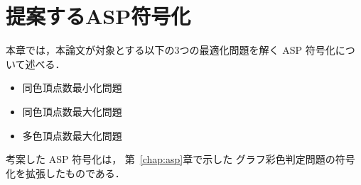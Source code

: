 \chapter{提案するASP符号化}\label{chap:encoding}

本章では，本論文が対象とする以下の3つの最適化問題を解く ASP 符号化につ
いて述べる．

\begin{itemize}
\item 同色頂点数最小化問題
\item 同色頂点数最大化問題
\item 多色頂点数最大化問題
\end{itemize}

考案した ASP 符号化は，
第~\ref{chap:asp}章で示した
グラフ彩色判定問題の符号化を拡張したものである．


% 




% 

